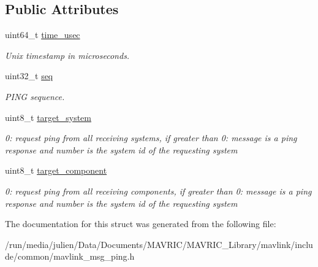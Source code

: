 \subsection*{Public Attributes}
\begin{DoxyCompactItemize}
\item 
\hypertarget{struct____mavlink__ping__t_a78bf2339554a175c2b5423fee61cf619}{uint64\+\_\+t \hyperlink{struct____mavlink__ping__t_a78bf2339554a175c2b5423fee61cf619}{time\+\_\+usec}}\label{struct____mavlink__ping__t_a78bf2339554a175c2b5423fee61cf619}

\begin{DoxyCompactList}\small\item\em Unix timestamp in microseconds. \end{DoxyCompactList}\item 
\hypertarget{struct____mavlink__ping__t_a753c4aa80232a414c05065646175bf46}{uint32\+\_\+t \hyperlink{struct____mavlink__ping__t_a753c4aa80232a414c05065646175bf46}{seq}}\label{struct____mavlink__ping__t_a753c4aa80232a414c05065646175bf46}

\begin{DoxyCompactList}\small\item\em P\+I\+N\+G sequence. \end{DoxyCompactList}\item 
\hypertarget{struct____mavlink__ping__t_a349dd7a0a95dc0a9faef1a498172efe3}{uint8\+\_\+t \hyperlink{struct____mavlink__ping__t_a349dd7a0a95dc0a9faef1a498172efe3}{target\+\_\+system}}\label{struct____mavlink__ping__t_a349dd7a0a95dc0a9faef1a498172efe3}

\begin{DoxyCompactList}\small\item\em 0\+: request ping from all receiving systems, if greater than 0\+: message is a ping response and number is the system id of the requesting system \end{DoxyCompactList}\item 
\hypertarget{struct____mavlink__ping__t_aea8c79743c35ac8e9d3d3362e2723f17}{uint8\+\_\+t \hyperlink{struct____mavlink__ping__t_aea8c79743c35ac8e9d3d3362e2723f17}{target\+\_\+component}}\label{struct____mavlink__ping__t_aea8c79743c35ac8e9d3d3362e2723f17}

\begin{DoxyCompactList}\small\item\em 0\+: request ping from all receiving components, if greater than 0\+: message is a ping response and number is the system id of the requesting system \end{DoxyCompactList}\end{DoxyCompactItemize}


The documentation for this struct was generated from the following file\+:\begin{DoxyCompactItemize}
\item 
/run/media/julien/\+Data/\+Documents/\+M\+A\+V\+R\+I\+C/\+M\+A\+V\+R\+I\+C\+\_\+\+Library/mavlink/include/common/mavlink\+\_\+msg\+\_\+ping.\+h\end{DoxyCompactItemize}
